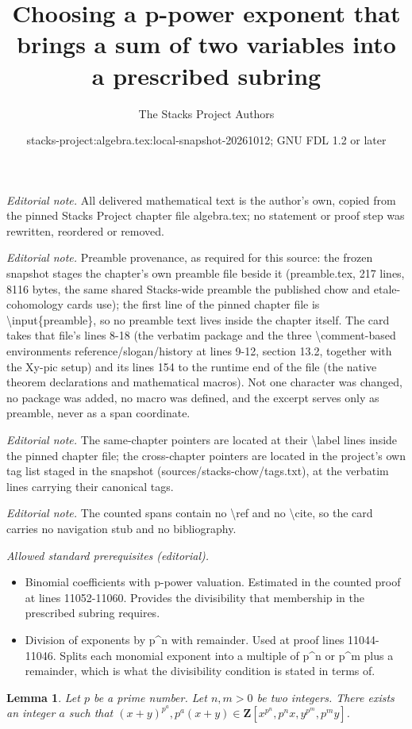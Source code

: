 \documentclass[10pt,a4paper]{amsart}
\title{Choosing a p-power exponent that brings a sum of two variables into a prescribed subring}
\author{The Stacks Project Authors}
\date{stacks-project:algebra.tex:local-snapshot-20261012; GNU FDL 1.2 or later}
\theoremstyle{plain}
\newtheorem{lemma}[subsection]{Lemma}
\theoremstyle{definition}
\theoremstyle{remark}
\numberwithin{equation}{subsection}
\begin{document}
\maketitle
\noindent\textit{Editorial note.} All delivered mathematical text is the author's own, copied from the pinned Stacks Project chapter file algebra.tex; no statement or proof step was rewritten, reordered or removed.\par\medskip
\noindent\textit{Editorial note.} Preamble provenance, as required for this source: the frozen snapshot stages the chapter's own preamble file beside it (preamble.tex, 217 lines, 8116 bytes, the same shared Stacks-wide preamble the published chow and etale-cohomology cards use); the first line of the pinned chapter file is \textbackslash{}input\{preamble\}, so no preamble text lives inside the chapter itself. The card takes that file's lines 8-18 (the verbatim package and the three \textbackslash{}comment-based environments reference/slogan/history at lines 9-12, section 13.2, together with the Xy-pic setup) and its lines 154 to the runtime end of the file (the native theorem declarations and mathematical macros). Not one character was changed, no package was added, no macro was defined, and the excerpt serves only as preamble, never as a span coordinate.\par\medskip
\noindent\textit{Editorial note.} The same-chapter pointers are located at their \textbackslash{}label lines inside the pinned chapter file; the cross-chapter pointers are located in the project's own tag list staged in the snapshot (sources/stacks-chow/tags.txt), at the verbatim lines carrying their canonical tags.\par\medskip
\noindent\textit{Editorial note.} The counted spans contain no \textbackslash{}ref and no \textbackslash{}cite, so the card carries no navigation stub and no bibliography.\par\medskip
\noindent\textit{Allowed standard prerequisites (editorial).}\begin{itemize}
\item Binomial coefficients with p-power valuation. Estimated in the counted proof at lines 11052-11060. Provides the divisibility that membership in the prescribed subring requires.
\item Division of exponents by p\textasciicircum{}n with remainder. Used at proof lines 11044-11046. Splits each monomial exponent into a multiple of p\textasciicircum{}n or p\textasciicircum{}m plus a remainder, which is what the divisibility condition is stated in terms of.
\end{itemize}\medskip
\begin{lemma}
\label{lemma-help-with-powers}
Let $p$ be a prime number. Let $n, m > 0$ be two integers. There exists
an integer $a$ such that
$(x + y)^{p^a}, p^a(x + y) \in \mathbf{Z}[x^{p^n}, p^nx, y^{p^m}, p^my]$.
\end{lemma}
\end{document}
